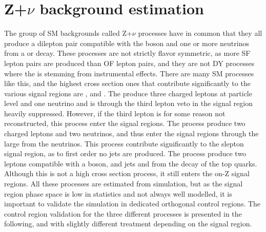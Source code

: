 \section{Z+$\nu$ background estimation}\label{sec:Znu}
\noindent\justify
The group of SM backgrounds called Z+$\nu$ processes have in common that they all produce a dilepton pair compatible with the \PZ boson and one or more neutrinos from a \PZ or \PW decay. 
These processes are not strictly flavor symmetric, as more SF lepton pairs are produced than OF lepton pairs, and they are not DY processes where the \ptmiss is stemming from instrumental effects. 
There are many SM processes like this, and the highest cross section ones that contribute significantly to the various signal regions are \PWZ, \PZZ and \ttZ. 
The \PWZ produce three charged leptons at particle level and one neutrino and is through the third lepton veto in the signal region heavily suppressed. 
However, if the third lepton is for some reason not reconstructed, this process enter the signal regions.  
The \PZZ process produce two charged leptons and two neutrinos, and thus enter the signal regions through the large \ptmiss from the neutrinos. 
This process contribute significantly to the slepton signal region, as to first order no jets are produced. 
The \ttZ process produce two leptons compatible with a \PZ boson, and jets and \ptmiss from the decay of the top quarks. 
Although this is not a high cross section process, it still enters the on-Z signal regions. 
All these processes are estimated from simulation, but as the signal region phase space is low in statistics and not always well modelled, it is important to validate the simulation in dedicated orthogonal control regions. 
The control region validation for the three different processes is presented in the following, and with slightly different treatment depending on the signal region.  
